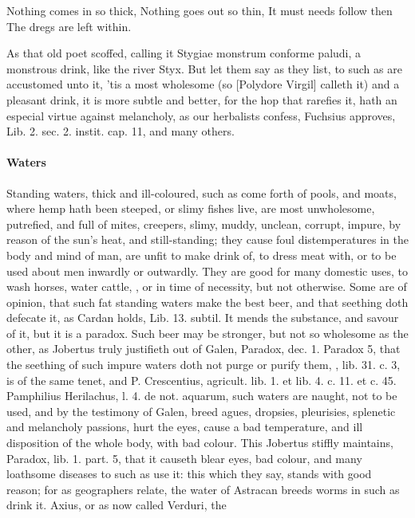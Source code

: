 {{Nothing comes in so thick,
Nothing goes out so thin,
It must needs follow then
The dregs are left within.

As that old poet scoffed, calling it Stygiae monstrum conforme
paludi, a monstrous drink, like the river Styx. But let them say as
they list, to such as are accustomed unto it, 'tis a most wholesome (so
 [Polydore Virgil] calleth it) and a pleasant drink, it is more
subtle and better, for the hop that rarefies it, hath an especial
virtue against melancholy, as our herbalists confess, Fuchsius
approves, Lib. 2. sec. 2. instit. cap. 11, and many others.

\paragraph{Waters} Standing waters, thick and ill-coloured, such as come forth of
pools, and moats, where hemp hath been steeped, or slimy fishes live,
are most unwholesome, putrefied, and full of mites, creepers, slimy,
muddy, unclean, corrupt, impure, by reason of the sun's heat, and
still-standing; they cause foul distemperatures in the body and mind of
man, are unfit to make drink of, to dress meat with, or to be
used about men inwardly or outwardly. They are good for many
domestic uses, to wash horses, water cattle, \etc{}, or in time of
necessity, but not otherwise. Some are of opinion, that such fat
standing waters make the best beer, and that seething doth defecate it,
as Cardan holds, Lib. 13. subtil. It mends the substance, and
savour of it, but it is a paradox. Such beer may be stronger, but not
so wholesome as the other, as Jobertus truly justifieth out of
Galen, Paradox, dec. 1. Paradox 5, that the seething of such impure
waters doth not purge or purify them, \Pliny{}, lib. 31. c. 3, is of the
same tenet, and P. Crescentius, agricult. lib. 1. et lib. 4. c. 11. et
c. 45. Pamphilius Herilachus, l. 4. de not. aquarum, such waters are
naught, not to be used, and by the testimony of Galen, breed
agues, dropsies, pleurisies, splenetic and melancholy passions, hurt
the eyes, cause a bad temperature, and ill disposition of the whole
body, with bad colour. This Jobertus stiffly maintains, Paradox, lib.
1. part. 5, that it causeth blear eyes, bad colour, and many loathsome
diseases to such as use it: this which they say, stands with good
reason; for as geographers relate, the water of Astracan breeds worms
in such as drink it.  Axius, or as now called Verduri, the
}}
